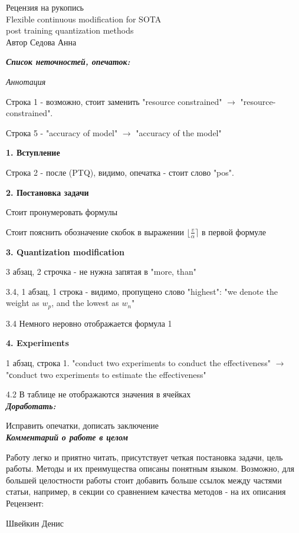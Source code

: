 \documentclass[DIV=16]{scrartcl}
\begin{document}
	
	\begin{LARGE}
	\begin{center}
		Рецензия на рукопись \\
		Flexible continuous modification for SOTA \\
		post training quantization methods \\
		Автор Седова Анна
	\end{center}
	\end{LARGE}

	\textit{\textbf{Список неточностей, опечаток:}}

	\textit{Аннотация}
	
	Строка 1 - возможно, стоит заменить "resource constrained" $\rightarrow$ "resource-constrained".
	
	Строка 5 - "accuracy of model" $\rightarrow$ "accuracy of the model"
	
	\textbf{1. Вступление}
	
	Строка 2 - после (PTQ), видимо, опечатка - стоит слово "pos".
	
	\textbf{2. Постановка задачи}
	
	Стоит пронумеровать формулы
	
	Стоит пояснить обозначение скобок в выражении $\lfloor\frac{v}{\alpha}\rceil$ в первой формуле
	
	\textbf{3. Quantization modification}
	
	3 абзац, 2 строчка - не нужна запятая в "more, than"
	
	3.4, 1 абзац, 1 строка - видимо, пропущено слово "highest": "we denote the weight as $w_p$, and the lowest as $w_n$"
	
	3.4 Немного неровно отображается формула 1
	
	\textbf{4. Experiments}
	
	1 абзац, строка 1. "conduct two experiments to conduct the effectiveness" $\rightarrow$ "сonduct two experiments to estimate the effectiveness" 
	
	4.2 В таблице не отображаются значения в ячейках \\
	
	\textbf{\textit{Доработать:}}
	
	Исправить опечатки, дописать заключение \\
	
	\textbf{\textit{Комментарий о работе в целом}}
	
	Работу легко и приятно читать, присутствует четкая постановка задачи, цель работы. Методы и их преимущества описаны понятным языком. Возможно, для большей целостности работы стоит добавить больше ссылок между частями статьи, например, в секции со сравнением качества методов - на их описания \\
	
	Рецензент:
	
	Швейкин Денис
	
	
\end{document}
